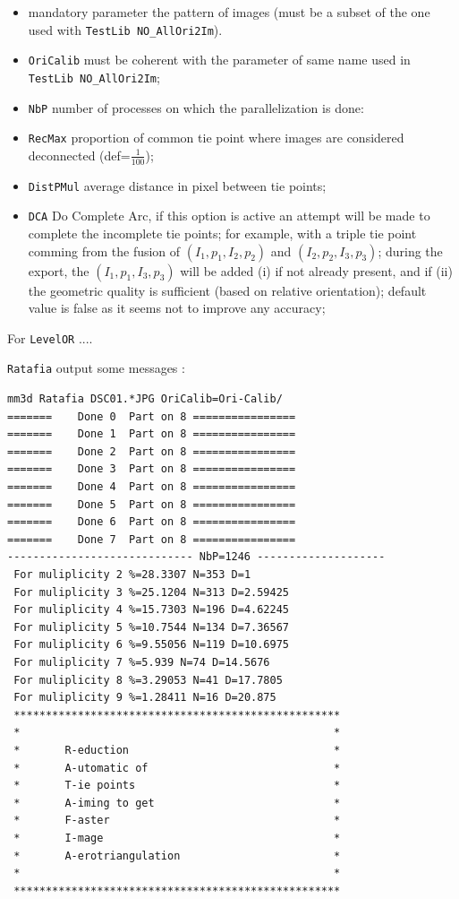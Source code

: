 \begin{itemize}
   \item mandatory parameter the pattern of images (must be a subset of the one used with {\tt TestLib NO\_AllOri2Im}).

   \item  {\tt OriCalib} must be coherent with the parameter of same name used in {\tt TestLib NO\_AllOri2Im};

   \item  {\tt NbP} number of processes on which the parallelization is done:

   \item  {\tt RecMax} proportion of common tie point where images are considered deconnected (def=$\frac{1}{100}$);

   \item  {\tt DistPMul} average distance in pixel between tie points;

   \item  {\tt DCA} Do Complete Arc, if this option is active an attempt will be made to complete the incomplete
          tie points; for example, with a triple tie point comming from the fusion of $(I_1,p_1,I_2,p_2)$ and
          $(I_2,p_2,I_3,p_3)$; during the export, the $(I_1,p_1,I_3,p_3)$ will be added (i) if not already present, and if (ii)
          the geometric quality is sufficient (based on relative orientation); default value is false as it 
          seems not to improve any accuracy;
\end{itemize}

For  {\tt LevelOR} ....


{\tt Ratafia} output some messages :

\begin{verbatim}
mm3d Ratafia DSC01.*JPG OriCalib=Ori-Calib/
=======    Done 0  Part on 8 ================
=======    Done 1  Part on 8 ================
=======    Done 2  Part on 8 ================
=======    Done 3  Part on 8 ================
=======    Done 4  Part on 8 ================
=======    Done 5  Part on 8 ================
=======    Done 6  Part on 8 ================
=======    Done 7  Part on 8 ================
----------------------------- NbP=1246 --------------------
 For muliplicity 2 %=28.3307 N=353 D=1
 For muliplicity 3 %=25.1204 N=313 D=2.59425
 For muliplicity 4 %=15.7303 N=196 D=4.62245
 For muliplicity 5 %=10.7544 N=134 D=7.36567
 For muliplicity 6 %=9.55056 N=119 D=10.6975
 For muliplicity 7 %=5.939 N=74 D=14.5676
 For muliplicity 8 %=3.29053 N=41 D=17.7805
 For muliplicity 9 %=1.28411 N=16 D=20.875
 ***************************************************
 *                                                 *
 *       R-eduction                                *
 *       A-utomatic of                             *
 *       T-ie points                               *
 *       A-iming to get                            *
 *       F-aster                                   *
 *       I-mage                                    *
 *       A-erotriangulation                        *
 *                                                 *
 ***************************************************
\end{verbatim}


